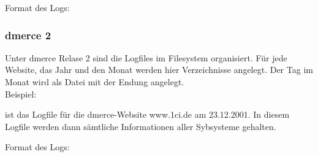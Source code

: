 Format des Logs:\\

\begin{center}\end{center}

\subsubsection{dmerce 2}

Unter dmerce Relase 2 sind die Logfiles im Filesystem
 organisiert. F\"ur jede Website, das Jahr
und den Monat werden hier Verzeichnisse angelegt.
Der Tag im Monat wird als Datei mit der Endung  angelegt.\\


Beispiel:\\

\begin{center}\end{center}

ist das Logfile f\"ur die dmerce-Website www.1ci.de am 23.12.2001. In
diesem Logfile werden dann s\"amtliche Informationen aller Sybsysteme
gehalten.


Format des Logs:\\

\begin{center}\end{center}
